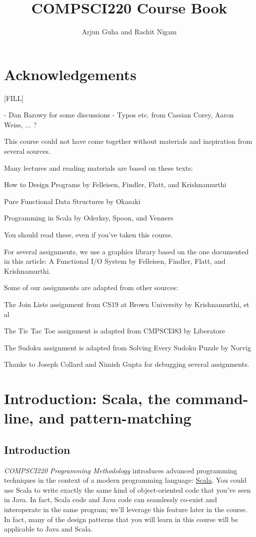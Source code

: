 \documentclass[9pt]{extbook}
\title{COMPSCI220 Course Book}
\author{Arjun Guha and Rachit Nigam}
\begin{document}
\maketitle
\tableofcontents

\chapter{Acknowledgements}

[FILL]

- Dan Barowy for some discussions
- Typos etc. from Cassian Corey, Aaron Weiss, ... ?

This course could not have come together without materials and inspiration from
several sources.

Many lectures and reading materials are based on these texts:

How to Design Programs by Felleisen, Findler, Flatt, and Krishnamurthi

Pure Functional Data Structures by Okasaki

Programming in Scala by Oderksy, Spoon, and Venners

You should read these, even if you’ve taken this course.

For several assignments, we use a graphics library based on the one documented in this article: A Functional I/O System by Felleisen, Findler, Flatt, and Krishnamurthi.

Some of our assignments are adapted from other sources:

The Join Lists assignment from CS19 at Brown University by Krishnamurthi, et al

The Tic Tac Toe assignment is adapted from CMPSCI383 by Liberatore

The Sudoku assignment is adapted from Solving Every Sudoku Puzzle by Norvig

Thanks to Joseph Collard and Nimish Gupta for debugging several assignments.


\chapter{Introduction: Scala, the command-line, and pattern-matching}

\section{Introduction}

\emph{COMPSCI220 Programming Methodology} introduces advanced programming
techniques in the context of a modern programming language:
\href{http://www.scala-lang.org/}{Scala}.
You could use Scala to write exactly the same kind
of object-oriented code that you've seen in Java. In fact, Scala code and Java
code can seamlessly co-exist and interoperate in the same program; we'll
leverage this feature later in the course. In fact, many of the design patterns
that you will learn in this course will be applicable to Java and Scala.
\end{document}
